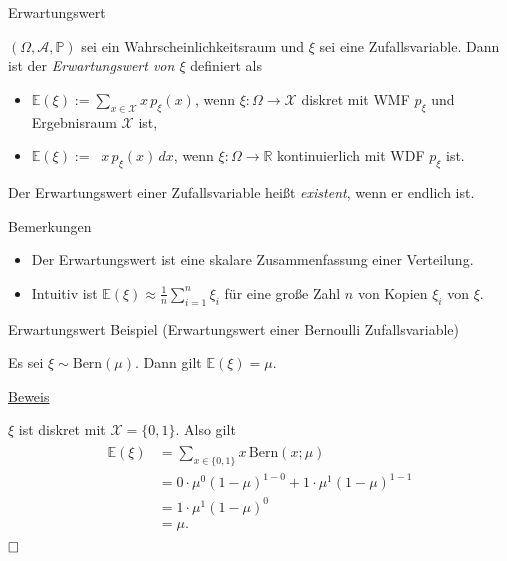 \documentclass[
  8pt,
  ignorenonframetext,
]{beamer}
\providecommand{\tightlist}{%
  \setlength{\itemsep}{0pt}\setlength{\parskip}{0pt}}
\DeclareMathOperator*{\intinf}{\int_{-\infty}^{\infty}}
\begin{document}
\begin{frame}{Erwartungswert}
\protect\hypertarget{erwartungswert}{}
\small
\begin{definition}[Erwartungswert]
\justifying
$(\Omega, \mathcal{A},\mathbb{P})$ sei ein Wahrscheinlichkeitsraum und $\xi$
sei eine  Zufallsvariable. Dann ist der \textit{Erwartungswert von $\xi$} definiert als
\begin{itemize}
\item 
$\mathbb{E}(\xi)
:=
\sum_{x \in \mathcal{X}} x\,p_\xi(x)$,
wenn $\xi : \Omega \to \mathcal{X}$ diskret mit WMF $p_\xi$ und Ergebnisraum $\mathcal{X}$ ist,
\item
$\mathbb{E}(\xi)
:=
\intinf x \,p_\xi(x)\,dx$,
wenn $\xi : \Omega \to \mathbb{R}$ kontinuierlich mit WDF $p_\xi$ ist.
\end{itemize}
Der Erwartungswert einer Zufallsvariable heißt \textit{existent}, wenn er endlich ist.
\end{definition}

Bemerkungen

\begin{itemize}
\tightlist
\item
  Der Erwartungswert ist eine skalare Zusammenfassung einer Verteilung.
\item
  Intuitiv ist \(\mathbb{E}(\xi) \approx \frac{1}{n}\sum_{i=1}^n \xi_i\)
  für eine große Zahl \(n\) von Kopien \(\xi_i\) von \(\xi\).
\end{itemize}
\end{frame}

\begin{frame}{Erwartungswert}
\protect\hypertarget{erwartungswert-1}{}
Beispiel (Erwartungswert einer Bernoulli Zufallsvariable) \vspace{2mm}

\small

Es sei \(\xi \sim \mbox{Bern}(\mu)\). Dann gilt
\(\mathbb{E}(\xi) = \mu\). \vspace{5mm}

\underline{Beweis} \vspace{1mm}

\(\xi\) ist diskret mit \(\mathcal{X} = \{0,1\}\). Also gilt
\begin{align}
\begin{split}
\mathbb{E}(\xi)
& = \sum_{x \in \{0,1\}} x\,\mbox{Bern}(x;\mu) \\
& = 0\cdot \mu^0 (1 - \mu)^{1-0} + 1\cdot \mu^1 (1 - \mu)^{1-1} \\
& = 1\cdot \mu^1 (1 - \mu)^{0} \\
& = \mu.
\end{split}
\end{align} \(\hfill \Box\)
\end{frame}
\end{document}
